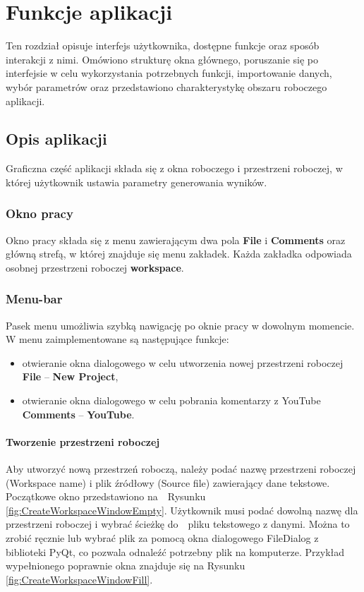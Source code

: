 \chapter{Funkcje aplikacji}

Ten rozdział  opisuje interfejs użytkownika, dostępne funkcje oraz sposób interakcji z nimi. Omówiono strukturę okna głównego, poruszanie się po interfejsie w celu wykorzystania potrzebnych funkcji, importowanie danych, wybór parametrów oraz przedstawiono charakterystykę obszaru roboczego aplikacji.


\section{Opis aplikacji}

	Graficzna część aplikacji składa się z okna roboczego i przestrzeni roboczej, w której użytkownik ustawia parametry generowania wyników.

	\subsection{Okno pracy}
		Okno pracy składa się z menu zawierającym dwa pola \textbf{File} i \textbf{Comments} oraz główną strefą, w której znajduje się menu zakładek. Każda zakładka odpowiada osobnej przestrzeni roboczej \textbf{workspace}.

		
	\subsection{Menu-bar}
		Pasek menu umożliwia szybką nawigację po oknie pracy w dowolnym momencie. W menu zaimplementowane są następujące funkcje:
		\begin{itemize}
			\item otwieranie okna dialogowego w celu utworzenia nowej przestrzeni roboczej \textbf{File} -- \textbf{New Project},
			\item otwieranie okna dialogowego w celu pobrania komentarzy z YouTube \textbf{Comments} -- \textbf{YouTube}.
		\end{itemize}


		
		\subsubsection{Tworzenie przestrzeni roboczej}
			Aby utworzyć nową przestrzeń roboczą, należy podać nazwę przestrzeni roboczej (Workspace name) i plik źródłowy (Source file) zawierający dane tekstowe. Początkowe okno przedstawiono na~~Rysunku \ref{fig:CreateWorkspaceWindowEmpty}. Użytkownik musi podać dowolną nazwę dla przestrzeni roboczej i wybrać ścieżkę do~~pliku tekstowego z danymi. Można to zrobić ręcznie lub wybrać plik za pomocą okna dialogowego FileDialog z biblioteki PyQt, co pozwala odnaleźć potrzebny plik na komputerze. Przykład wypełnionego poprawnie okna znajduje się na Rysunku \ref{fig:CreateWorkspaceWindowFill}.
			
